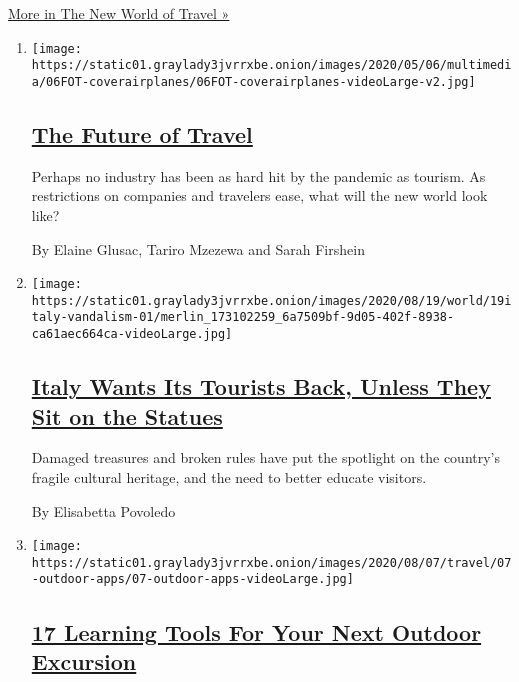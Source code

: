 \href{/spotlight/the-new-world-of-travel}{More in The New World of
Travel »}

\begin{enumerate}
\def\labelenumi{\arabic{enumi}.}
\item
  \texttt{[image: https://static01.graylady3jvrrxbe.onion/images/2020/05/06/multimedia/06FOT-coverairplanes/06FOT-coverairplanes-videoLarge-v2.jpg]}

  \hypertarget{the-future-of-travel}{%
  \subsection{\texorpdfstring{\href{/interactive/2020/05/06/travel/coronavirus-travel-questions.html}{The
  Future of Travel}}{The Future of Travel}}\label{the-future-of-travel}}

  Perhaps no industry has been as hard hit by the pandemic as tourism.
  As restrictions on companies and travelers ease, what will the new
  world look like?

  By Elaine Glusac, Tariro Mzezewa and Sarah Firshein
\item
  \texttt{[image: https://static01.graylady3jvrrxbe.onion/images/2020/08/19/world/19italy-vandalism-01/merlin\_173102259\_6a7509bf-9d05-402f-8938-ca61aec664ca-videoLarge.jpg]}

  \hypertarget{italy-wants-its-tourists-back-unless-they-sit-on-the-statues}{%
  \subsection{\texorpdfstring{\href{/2020/08/19/world/europe/italy-vandalism-tourism.html}{Italy
  Wants Its Tourists Back, Unless They Sit on the
  Statues}}{Italy Wants Its Tourists Back, Unless They Sit on the Statues}}\label{italy-wants-its-tourists-back-unless-they-sit-on-the-statues}}

  Damaged treasures and broken rules have put the spotlight on the
  country's fragile cultural heritage, and the need to better educate
  visitors.

  By Elisabetta Povoledo
\item
  \texttt{[image: https://static01.graylady3jvrrxbe.onion/images/2020/08/07/travel/07-outdoor-apps/07-outdoor-apps-videoLarge.jpg]}

  \hypertarget{17-learning-tools-for-your-next-outdoor-excursion}{%
  \subsection{\texorpdfstring{\href{/2020/08/11/travel/outdoors-apps-podcasts.html}{17
  Learning Tools For Your Next Outdoor
  Excursion}}{17 Learning Tools For Your Next Outdoor Excursion}}\label{17-learning-tools-for-your-next-outdoor-excursion}}


\end{enumerate}
